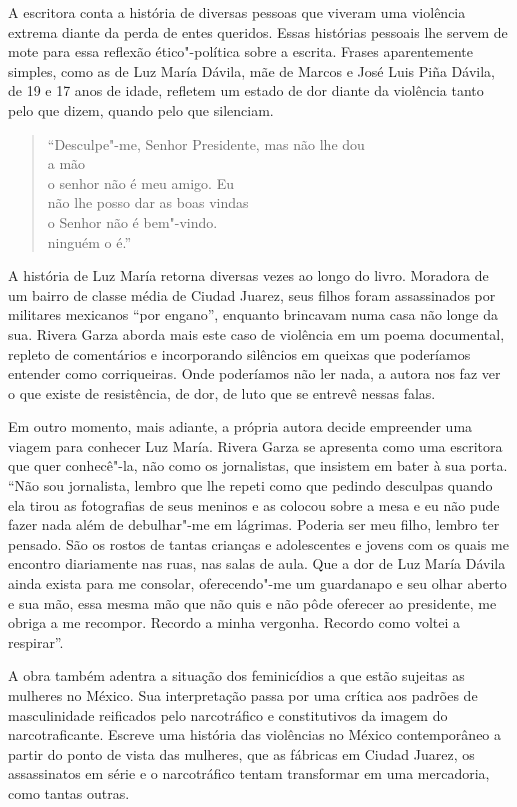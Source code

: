A escritora conta a história de diversas pessoas que viveram uma
violência extrema diante da perda de entes queridos.
Essas histórias pessoais lhe servem de mote para essa reflexão
ético"-política sobre a escrita. Frases
aparentemente simples, como as de Luz María Dávila, mãe de Marcos e José
Luis Piña Dávila, de 19 e 17 anos de idade, refletem um estado de dor
diante da violência tanto pelo que dizem, quando pelo que silenciam.

\pagebreak

\begin{verse}
``Desculpe"-me, Senhor Presidente, \qb{}mas não lhe dou\\
a mão\\
o senhor não é meu amigo. Eu\\
não lhe posso dar as boas vindas\\
o Senhor não é bem"-vindo.\\
ninguém o é.''
\end{verse}

A história de Luz María retorna diversas vezes ao longo do livro. Moradora
de um bairro de classe média de Ciudad Juarez, seus filhos foram
assassinados por militares mexicanos ``por engano'', enquanto brincavam
numa casa não longe da sua. Rivera Garza aborda mais este caso de
violência em um poema documental, repleto de comentários e incorporando
silêncios em queixas que poderíamos entender como corriqueiras. Onde
poderíamos não ler nada, a autora nos faz ver o que existe de
resistência, de dor, de luto que se entrevê nessas falas.

Em outro momento, mais adiante, a própria autora decide
empreender uma viagem para conhecer Luz María. Rivera Garza se apresenta
como uma escritora que quer conhecê"-la, não como os jornalistas, que
insistem em bater à sua porta. ``Não sou jornalista, lembro que lhe
repeti como que pedindo desculpas quando ela tirou as fotografias de
seus meninos e as colocou sobre a mesa e eu não pude fazer nada além de
debulhar"-me em lágrimas. Poderia ser meu filho, lembro ter pensado. São
os rostos de tantas crianças e adolescentes e jovens com os quais me
encontro diariamente nas ruas, nas salas de aula. Que a dor de Luz María
Dávila ainda exista para me consolar, oferecendo"-me um guardanapo e seu
olhar aberto e sua mão, essa mesma mão que não quis e não pôde oferecer
ao presidente, me obriga a me recompor. Recordo a minha vergonha.
Recordo como voltei a respirar''.

A obra também adentra a situação dos feminicídios a que estão sujeitas as mulheres no México. Sua interpretação
passa por uma crítica aos padrões de masculinidade reificados pelo
narcotráfico e constitutivos da imagem do narcotraficante. Escreve uma
história das violências no México contemporâneo a partir do ponto de
vista das mulheres, que as fábricas em Ciudad Juarez, os assassinatos em série e o narcotráfico tentam transformar em uma mercadoria, como tantas outras.

